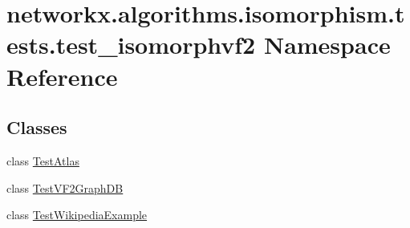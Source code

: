 \hypertarget{namespacenetworkx_1_1algorithms_1_1isomorphism_1_1tests_1_1test__isomorphvf2}{}\section{networkx.\+algorithms.\+isomorphism.\+tests.\+test\+\_\+isomorphvf2 Namespace Reference}
\label{namespacenetworkx_1_1algorithms_1_1isomorphism_1_1tests_1_1test__isomorphvf2}
\subsection*{Classes}
\begin{DoxyCompactItemize}
\item 
class \hyperlink{classnetworkx_1_1algorithms_1_1isomorphism_1_1tests_1_1test__isomorphvf2_1_1TestAtlas}{Test\+Atlas}
\item 
class \hyperlink{classnetworkx_1_1algorithms_1_1isomorphism_1_1tests_1_1test__isomorphvf2_1_1TestVF2GraphDB}{Test\+V\+F2\+Graph\+DB}
\item 
class \hyperlink{classnetworkx_1_1algorithms_1_1isomorphism_1_1tests_1_1test__isomorphvf2_1_1TestWikipediaExample}{Test\+Wikipedia\+Example}
\end{DoxyCompactItemize}
